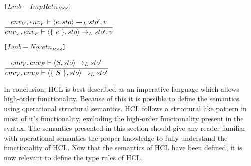 \texttt{[$Lmb-ImpRetn_{BSS}$]}
\begin{center}
	\begin{math}
	\cfrac
	{env_V, env_F \vdash \langle e, sto \rangle \rightarrow_L sto', v}
	{env_V, env_F \vdash \langle \{\ e\ \}, sto \rangle \rightarrow_L sto', v}
	\end{math}
\end{center}

\texttt{[$Lmb-Noretn_{BSS}$]}
\begin{center}
	\begin{math}
		\cfrac
			{env_V, env_F \vdash \langle S, sto \rangle \rightarrow_L sto'}
			{env_V, env_F \vdash \langle \{\ S\ \}, sto \rangle \rightarrow_L sto'}
	\end{math}
\end{center}

In conclusion, HCL is best described as an imperative language which allows high-order functionality. 
Because of this it is possible to define the semantics using operational structural semantics.
HCL follows a structural like pattern in most of it's functionality, excluding the high-order functionality present in the syntax.
The semantics presented in this section should give any reader familiar with operational semantics the proper knowledge to fully understand the functionality of HCL.
Now that the semantics of HCL have been defined, it is now relevant to define the type rules of HCL.
